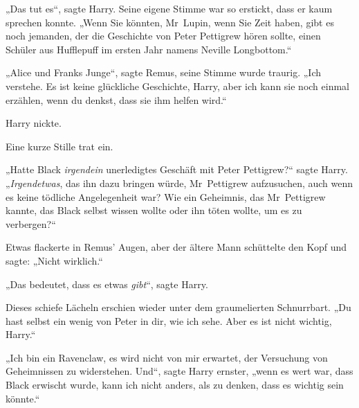 „Das tut es“, sagte Harry. Seine eigene Stimme war so erstickt, dass er kaum sprechen konnte.
„Wenn Sie könnten, Mr~Lupin, wenn Sie Zeit haben, gibt es noch jemanden, der die Geschichte von Peter Pettigrew hören sollte, einen Schüler aus Hufflepuff im ersten Jahr namens Neville Longbottom.“

„Alice und Franks Junge“, sagte Remus, seine Stimme wurde traurig.
„Ich verstehe. Es ist keine glückliche Geschichte, Harry, aber ich kann sie noch einmal erzählen, wenn du denkst, dass sie ihm helfen wird.“

Harry nickte.

Eine kurze Stille trat ein.

„Hatte Black \emph{irgendein} unerledigtes Geschäft mit Peter Pettigrew?“ sagte Harry.
„\emph{Irgendetwas}, das ihn dazu bringen würde, Mr~Pettigrew aufzusuchen, auch wenn es keine tödliche Angelegenheit war? Wie ein Geheimnis, das Mr~Pettigrew kannte, das Black selbst wissen wollte oder ihn töten wollte, um es zu verbergen?“

Etwas flackerte in Remus’ Augen, aber der ältere Mann schüttelte den Kopf und sagte:
„Nicht wirklich.“

„Das bedeutet, dass es etwas \emph{gibt}“, sagte Harry.

Dieses schiefe Lächeln erschien wieder unter dem graumelierten Schnurrbart.
„Du hast selbst ein wenig von Peter in dir, wie ich sehe. Aber es ist nicht wichtig, Harry.“

„Ich bin ein Ravenclaw, es wird nicht von mir erwartet, der Versuchung von Geheimnissen zu widerstehen. Und“, sagte Harry ernster, „wenn es wert war, dass Black erwischt wurde, kann ich nicht anders, als zu denken, dass es wichtig sein könnte.“

